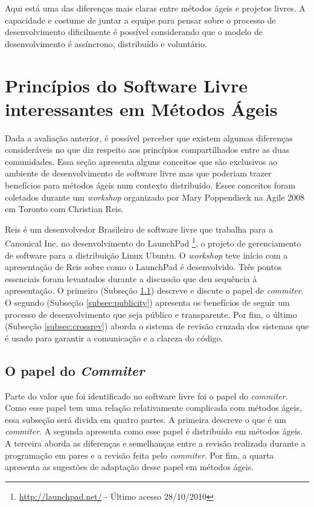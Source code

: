 Aqui está uma das diferenças mais claras entre métodos ágeis e
projetos livres. A capacidade e costume de juntar a equipe para pensar
sobre o processo de desenvolvimento dificilmente é possível
considerando que o modelo de desenvolvimento é assíncrono, distribuído
e voluntário.

\section{Princípios do Software Livre interessantes em Métodos Ágeis}
\label{sec:foss-over-agile}

Dada a avaliação anterior, é possível perceber que existem algumas
diferenças consideráveis no que diz respeito aos princípios
compartilhados entre as duas comunidades. Essa seção apresenta alguns
conceitos que são exclusivos ao ambiente de desenvolvimento de
software livre mas que poderiam trazer benefícios para métodos ágeis
num contexto distribuído. Esses conceitos foram coletados durante um
\emph{workshop} organizado por Mary Poppendieck na Agile 2008 em
Toronto com Christian Reis.

Reis é um desenvolvedor Brasileiro de software livre que trabalha para
a Canonical Inc. no desenvolvimento do LaunchPad
\footnote{\url{http://launchpad.net/} - Último acesso 28/10/2010}, o
projeto de gerenciamento de software para a distribuição Linux
Ubuntu. O \emph{workshop} teve início com a apresentação de Reis sobre
como o LaunchPad é desenvolvido. Três pontos essenciais foram
levantados durante a discussão que deu sequência à apresentação. O
primeiro (Subseção \ref{subsec:commiter}) descreve e discute o papel
de \emph{commiter}.  O segundo (Subseção \ref{subsec:publicity})
apresenta os benefícios de seguir um processo de desenvolvimento que
seja público e transparente.  Por fim, o último (Subseção
\ref{subsec:crossrev}) aborda o sistema de revisão cruzada dos
sistemas que é usado para garantir a comunicação e a clareza do
código.

\subsection{O papel do \emph{Commiter}}
\label{subsec:commiter}

Parte do valor que foi identificado no software livre foi o papel do
\emph{commiter}. Como esse papel tem uma relação relativamente
complicada com métodos ágeis, essa subseção será divida em quatro
partes. A primeira descreve o que é um \emph{commiter}. A segunda
apresenta como esse papel é distribuído em métodos ágeis. A terceira
aborda as diferenças e semelhanças entre a revisão realizada durante a
programação em pares e a revisão feita pelo \emph{commiter}. Por fim,
a quarta apresenta as sugestões de adaptação desse papel em métodos
ágeis.

